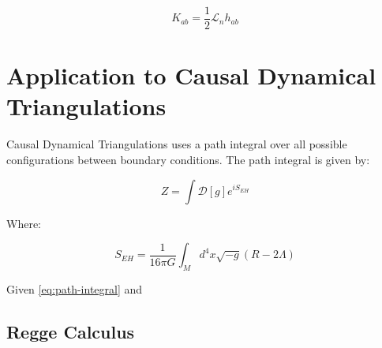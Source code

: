 \documentclass{article}
\begin{document}
\begin{equation}
K_{ab}=\frac{1}{2}\mathcal{L}_{n}h_{ab}
\end{equation}

\section{Application to Causal Dynamical Triangulations}

Causal Dynamical Triangulations uses a path integral over all possible
configurations between boundary conditions. The path integral is given
by:

\begin{equation}
  \label{eq:path-integral}
Z=\int \mathcal{D}[g]e^{iS_ {EH}}
\end{equation}

Where:

\begin{equation}
  \label{eq:einstein-hilbert-action}
  S_{EH}=\frac{1}{16\pi G}\int_{M}d^4 x\sqrt{-g}\left(R-2\Lambda\right)
\end{equation}

Given \eqref{eq:path-integral} and \cite{kommu2011} 

\subsection{Regge Calculus}





\end{document}
